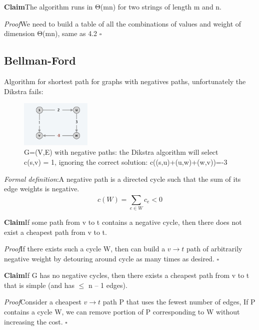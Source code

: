 \documentclass[11pt]{article}
\newenvironment{claim}[1]{\par\textbf{Claim}\space#1}{}
\newenvironment{proof}[1]{\par\textit{Proof}\space#1}{\hfill\ensuremath{\square}}
\begin{document}
\begin{claim}
The algorithm runs in Θ(mn) for two strings of length m and n.
\end{claim}

\begin{proof}
We need to build a table of all the combinations of values and weight of dimension Θ(mn), same as 4.2
\end{proof}

\subsection{Bellman-Ford}
Algorithm for shortest path for graphs with negatives paths, unfortunately the Dikstra fails:

\begin{figure}[H]
		\centering
		\includegraphics[width=0.3\textwidth ]{bellman}
		\caption{G=(V,E) with negative paths: the Dikstra algorithm will select c(s,v) = 1, ignoring the correct solution: c((s,u)+(u,w)+(w,v))=-3}
\end{figure}

\emph{Formal definition}:A negative path is a directed cycle such that the sum of its edge weights is negative.
\[ c(W) = \sum_{e \in W}^{} c_{e} < 0 \]

\begin{claim}
If some path from v to t contains a negative cycle, then there does not exist a cheapest path from v to t.
\end{claim}\\

\begin{proof}
If there exists such a cycle W, then can build a $v \rightarrow t$ path of arbitrarily negative weight by detouring around cycle as many times as desired.
\end{proof}\\

\begin{claim}
If G has no negative cycles, then there exists a cheapest path from v to t that is simple (and has $\leq$ n – 1 edges).
\end{claim}

\begin{proof}
Consider a cheapest $v\rightarrow t$ path P that uses the fewest number of edges, If P contains a cycle W, we can remove portion of P corresponding to W
without increasing the cost.
\end{proof}\\
\end{document}
